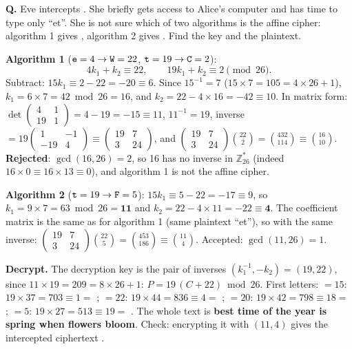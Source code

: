 \begin{worked}
\textbf{Q.} Eve intercepts . She briefly gets access to Alice's computer and has time to type only ``et''. She is not sure which of two algorithms is the affine cipher: algorithm 1 gives , algorithm 2 gives . Find the key and the plaintext.

\textbf{Algorithm 1} ($\texttt{e} = 4 \to \texttt{W} = 22$, $\texttt{t} = 19 \to \texttt{C} = 2$):
\[
4k_1 + k_2 \equiv 22, \qquad 19k_1 + k_2 \equiv 2 \pmod{26}.
\]
Subtract: $15k_1 \equiv 2 - 22 = -20 \equiv 6$. Since $15^{-1} = 7$ ($15 \times 7 = 105 = 4 \times 26 + 1$), $k_1 = 6 \times 7 = 42 \bmod 26 = 16$, and $k_2 = 22 - 4 \times 16 = -42 \equiv 10$. In matrix form: $\det\left(\begin{smallmatrix}4 & 1\\ 19 & 1\end{smallmatrix}\right) = 4 - 19 = -15 \equiv 11$, $11^{-1} = 19$, inverse $= 19\left(\begin{smallmatrix}1 & -1\\ -19 & 4\end{smallmatrix}\right) \equiv \left(\begin{smallmatrix}19 & 7\\ 3 & 24\end{smallmatrix}\right)$, and $\left(\begin{smallmatrix}19 & 7\\ 3 & 24\end{smallmatrix}\right)\binom{22}{2} = \binom{432}{114} \equiv \binom{16}{10}$. \textbf{Rejected}: $\gcd(16, 26) = 2$, so 16 has no inverse in $\mathbb{Z}_{26}^*$ (indeed $16 \times 0 \equiv 16 \times 13 \equiv 0$), and algorithm 1 is not the affine cipher.

\textbf{Algorithm 2} ($\texttt{t} = 19 \to \texttt{F} = 5$): $15k_1 \equiv 5 - 22 = -17 \equiv 9$, so $k_1 = 9 \times 7 = 63 \bmod 26 = \mathbf{11}$ and $k_2 = 22 - 4 \times 11 = -22 \equiv \mathbf{4}$. The coefficient matrix is the same as for algorithm 1 (same plaintext ``et''), so with the same inverse: $\left(\begin{smallmatrix}19 & 7\\ 3 & 24\end{smallmatrix}\right)\binom{22}{5} = \binom{453}{186} \equiv \binom{11}{4}$. Accepted: $\gcd(11, 26) = 1$.

\textbf{Decrypt.} The decryption key is the pair of inverses $(k_1^{-1}, -k_2) = (19, 22)$, since $11 \times 19 = 209 = 8 \times 26 + 1$: $P = 19\,(C + 22) \bmod 26$. First letters:  $= 15$: $19 \times 37 = 703 \equiv 1 = $ ;  $= 22$: $19 \times 44 = 836 \equiv 4 = $ ;  $= 20$: $19 \times 42 = 798 \equiv 18 = $ ;  $= 5$: $19 \times 27 = 513 \equiv 19 = $ . The whole text is \textbf{best time of the year is spring when flowers bloom}. Check: encrypting it with $(11, 4)$ gives the intercepted ciphertext \checkmark.
\end{worked}

